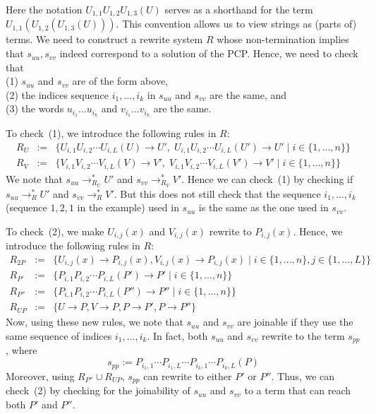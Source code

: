 \documentclass{LMCS}
\theoremstyle{plain}
\begin{document}
Here the notation 
$U_{1,1}U_{1,2}U_{1,3}(U)$ serves as a shorthand for the term
$U_{1,1}(U_{1,2}(U_{1,3}(U)))$. 
This convention allows us to view strings as (parts of) terms.
We need to construct a rewrite system $R$ whose non-termination 
implies that $s_{uu},s_{vv}$ indeed correspond
to a solution of the PCP.  Hence, we need to check that
\\
(1) $s_{uu}$ and $s_{vv}$ are of the form above,
\\
(2) the indices sequence $i_1,\ldots,i_k$ 
in $s_{uu}$ and $s_{vv}$ are the same, and
\\
(3) the words $u_{i_1}\ldots u_{i_k}$ and $v_{i_1}\ldots v_{i_k}$ are the same.

To check~(1), we introduce the following rules in $R$:
\begin{eqnarray}
R_U & := & \{ U_{i,1}U_{i,2}\cdots U_{i,L}(U) \rightarrow U', \;
	      U_{i,1}U_{i,2}\cdots U_{i,L}(U') \rightarrow U' \mid i\in\{1,\ldots,n\}\}
\nonumber
\\
R_V & := & \{ V_{i,1}V_{i,2}\cdots V_{i,L}(V) \rightarrow V', \; 
	      V_{i,1}V_{i,2}\cdots V_{i,L}(V') \rightarrow V' \mid i\in\{1,\ldots,n\}\}
\label{eqn-ru}
\end{eqnarray}
We note that $s_{uu} \rightarrow_{R_U}^* U'$ and
$s_{vv} \rightarrow_{R_V}^* V'$.
Hence we can check~(1) by checking if 
$s_{uu} \rightarrow_R^* U'$
and
$s_{vv} \rightarrow_R^* V'$.
But this does not still check that the sequence $i_1,\ldots,i_k$
(sequence $1,2,1$ in the example) used
in $s_{uu}$ is the same as the one used in $s_{vv}$.

To check~(2), we make $U_{i,j}(x)$ and $V_{i,j}(x)$ rewrite to
$P_{i,j}(x)$.  Hence, we introduce the following rules in $R$:
\begin{eqnarray}
R_{2P} & := & \{ U_{i,j}(x) \rightarrow P_{i,j}(x), V_{i,j}(x) \rightarrow P_{i,j}(x) \mid i\in\{1,\ldots,n\}, j\in\{1,\ldots,L\}\}
\nonumber
\\
R_{P'} & := & \{ P_{i,1}P_{i,2}\cdots P_{i,L}(P') \rightarrow P' \mid i\in\{1,\ldots,n\}\}
\nonumber
\\
R_{P''} & := & \{ P_{i,1}P_{i,2}\cdots P_{i,L}(P'') \rightarrow P'' \mid i\in\{1,\ldots,n\}\}
\nonumber
\\
R_{UP} & := & \{ U \rightarrow P,  V \rightarrow P, P \rightarrow P', P \rightarrow P''\}
\label{eqn-rp}
\end{eqnarray}
Now, using these new rules,
we note that $s_{uu}$ and $s_{vv}$ are joinable if
they use the same sequence of indices $i_1,\ldots,i_k$.
In fact, both $s_{uu}$ and $s_{vv}$ rewrite to the term
$s_{pp}$, where
$$
 s_{pp} := P_{i_1,1}\cdots P_{i_1,L}\cdots P_{i_k,1}\cdots P_{i_k,L}(P)
$$
Moreover, using $R_{P''}\cup R_{UP}$, 
$s_{pp}$ can rewrite to either $P'$ or $P''$.
Thus, we can check~(2) by checking for the joinability of 
$s_{uu}$ and $s_{vv}$ to a term that can reach both $P'$ and $P''$.
\end{document}
